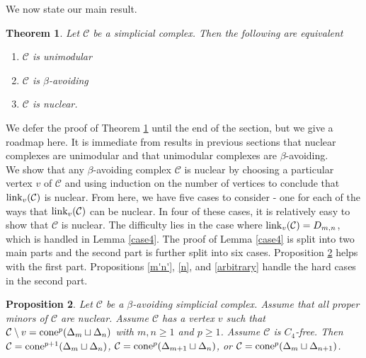 \documentclass[letterpaper,12pt]{amsart}
\theoremstyle{plain}
\newtheorem{thm}{Theorem}[section]
\newtheorem{prop}[thm]{Proposition}
\theoremstyle{definition}
\theoremstyle{remark}
\newcommand{\calc}{\mathcal{C}}
\newcommand{\link}{\textnormal{link}}
\newcommand{\cone}{\textnormal{cone}}
\begin{document}
We now state our main result.

\begin{thm}\label{main}
	Let $\mathcal{C}$ be a simplicial complex.
	Then the following are equivalent
	\begin{enumerate}
		\item\label{unimodular} $\mathcal{C}$ is unimodular
		\item\label{bavoiding} $\mathcal{C}$ is $\beta$-avoiding
		\item\label{nuclear} $\mathcal{C}$ is nuclear.
	\end{enumerate}
\end{thm}

{ We defer the proof of Theorem \ref{main} until the end of the section,
but we give a roadmap here.
It is immediate from results in previous sections that nuclear complexes are unimodular
and that unimodular complexes are $\beta$-avoiding.
\\
\indent
We show that any $\beta$-avoiding complex $\calc$ is nuclear by 
choosing a particular vertex $v$ of $\calc$ and using induction on the number of vertices to conclude that $\link_v(\calc)$ is nuclear.
From here, we have five cases to consider - one for each of the ways that $\link_v(\calc)$ can be nuclear.
In four of these cases, it is relatively easy to show that $\calc$ is nuclear.
The difficulty lies in the case where $\link_v(\calc) = D_{m,n}$, which is handled in Lemma \ref{case4}.
The proof of Lemma \ref{case4} is split into two main parts
and the second part is further split into six cases.
Proposition \ref{messy1} helps with the first part.
Propositions \ref{m'n'}, \ref{n}, and \ref{arbitrary} handle the hard cases in the second part.
}

\begin{prop}\label{messy1}
	Let $\mathcal{C}$ be a $\beta$-avoiding simplicial complex.
	Assume that all proper minors of $\mathcal{C}$ are nuclear.
	Assume $\mathcal{C}$ has a vertex $v$ such that $\mathcal{C}\setminus v = \cone^p(\Delta_m \sqcup \Delta_n)$
	with $m,n \ge 1$ and $p \ge 1$.
	Assume $\mathcal{C}$ is $C_4$-free.
	Then $\mathcal{C} = \cone^{p+1}(\Delta_m \sqcup \Delta_n)$,  $\mathcal{C} = \cone^p(\Delta_{m+1}\sqcup \Delta_n)$, or $\mathcal{C} = \cone^p(\Delta_{m}\sqcup \Delta_{n+1})$.
\end{prop}
\end{document}
